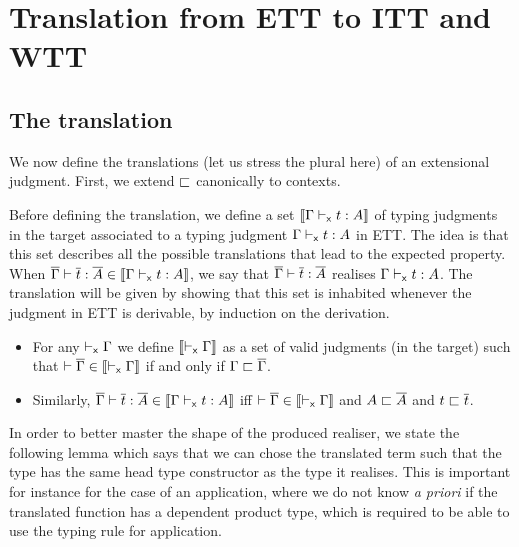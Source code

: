 \chapter{Translation from \acrshort{ETT} to \acrshort{ITT} and \acrshort{WTT}}

\section{The translation}

We now define the translations (let us stress the plural here) of an
extensional judgment. First, we extend $\sqsubset$ canonically to contexts.

Before defining the translation, we define a set
$\llbracket \Gamma \vdash_{\mathsf{x}} t : A \rrbracket$ of typing judgments in the target associated to a
typing judgment $\Gamma \vdash_{\mathsf{x}} t : A$ in \acrshort{ETT}.
%
The idea is that this set describes all the possible translations that
lead to the expected property. When
$\overline{\Gamma} \vdash \overline{t} : \overline{A} \in \llbracket \Gamma \vdash_{\mathsf{x}} t : A \rrbracket$, we say that
$\overline{\Gamma} \vdash \overline{t} : \overline{A}$ realises $\Gamma \vdash_{\mathsf{x}} t : A$. The
translation will be given by showing that this set is inhabited whenever the
judgment in \acrshort{ETT} is derivable, by induction on the derivation.

\begin{definition}
  \leavevmode
  \begin{itemize}
    \item For any $\vdash_{\mathsf{x}} \Gamma$ we define $\llbracket \vdash_{\mathsf{x}} \Gamma \rrbracket$ as a set of
    valid judgments (in the target) such that
    $\vdash \overline{\Gamma} \in \llbracket \vdash_{\mathsf{x}} \Gamma \rrbracket$ if and only if $\Gamma \sqsubset \overline{\Gamma}$.

    \item Similarly, $\overline{\Gamma} \vdash \overline{t} : \overline{A} \in \llbracket \Gamma \vdash_{\mathsf{x}} t : A \rrbracket$
    iff $\vdash \overline{\Gamma} \in \llbracket \vdash_{\mathsf{x}} \Gamma \rrbracket$ and $A \sqsubset \overline{A}$ and $t \sqsubset \overline{t}$.
  \end{itemize}
\end{definition}

In order to better master the shape of the produced realiser, we state the
following lemma which says that we can chose the translated term such that
the type has the same head type constructor as the type it realises.
%
This is important for instance for the case of an application, where we
do not know \emph{a priori} if the translated function has a dependent product
type, which is required to be able to use the typing rule for application.

